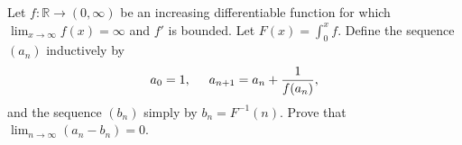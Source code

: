 \documentclass{article}
\begin{document}
\setlength{\parindent}{0pt}
Let $f:\mathbb{R}\to(0,\infty)$ be an increasing differentiable function for which $\lim_{x\to\infty}f(x)=\infty$ and $f'$ is bounded.\newline
Let $F(x)=\int_{0}^{x}f$. Define the sequence $(a_{n})$ inductively by $$a_{0}=1,\hspace*{0.5cm}a_{n+1}=a_{n}+\frac{1}{f(a_{n})},$$and the sequence $(b_{n})$ simply by $b_{n}=F^{-1}(n)$. Prove that $\lim_{n\to\infty}(a_{n}-b_{n})=0$.
\end{document}
